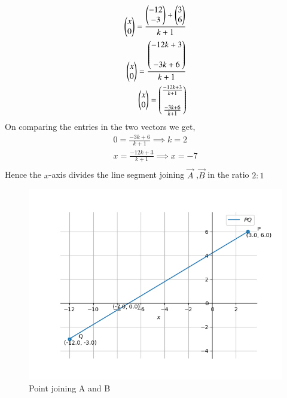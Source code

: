 \documentclass[journal]{IEEEtran}
\begin{document}
\begin{align}
	\begin{pmatrix}x \\ 0\end{pmatrix} = \frac{\begin{pmatrix}-12\\-3\end{pmatrix} + \begin{pmatrix}3\\6\end{pmatrix}}{k+1}\\
	\begin{pmatrix}x\\0\end{pmatrix} = \frac{\begin{pmatrix}-12k+3\\ \\-3k+6\end{pmatrix}}{k+1}\\
	\begin{pmatrix}x\\0\end{pmatrix} = \begin{pmatrix}\frac{-12k+3}{k+1}\\ \\ \frac{-3k+6}{k+1}\end{pmatrix}\\
\end{align}
On comparing the entries in the two vectors we get, 
\begin{align}
	0 = \frac{-3k+6}{k+1} \implies k = 2\\
	x = \frac{-12k+3}{k+1} \implies x = -7\\
\end{align}
Hence the $x$-axis divides the line segment joining $\vec{A}$ ,$\vec{B}$ in the ratio $2:1$
\begin{figure}[h!]
   \centering
   \includegraphics[width=0.7\linewidth]{figs/fig.png}
   \caption{Point joining A and B}
   \label{stemplot}
\end{figure}
\end{document}
